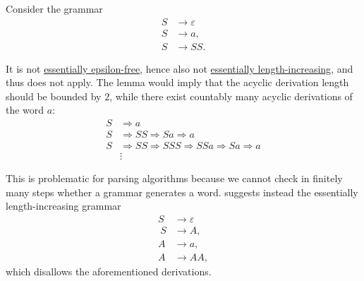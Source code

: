 \begin{example}\label{ex:unboudned_grammar_derivation_length}
  Consider the grammar
  \begin{equation}\label{eq:ex:unboudned_grammar_derivation_length/bad}
    \begin{aligned}
      S &\to \varepsilon \\
      S &\to a, \\
      S &\to SS.
    \end{aligned}
  \end{equation}

  It is not \hyperref[def:epsilon_free_grammar]{essentially epsilon-free}, hence also not \hyperref[def:length_increasing_grammar]{essentially length-increasing}, and thus  does not apply. The lemma would imply that the acyclic derivation length should be bounded by \( 2 \), while there exist countably many acyclic derivations of the word \( a \):
  \begin{equation*}
    \begin{aligned}
      S &\Rightarrow a \\
      S &\Rightarrow SS \Rightarrow Sa \Rightarrow a \\
      S &\Rightarrow SS \Rightarrow SSS \Rightarrow SSa \Rightarrow Sa \Rightarrow a \\
        &\vdots
    \end{aligned}
  \end{equation*}

  This is problematic for parsing algorithms because we cannot check in finitely many steps whether a grammar generates a word.  suggests instead the essentially length-increasing grammar
  \begin{equation*}
    \begin{aligned}
      S &\to \varepsilon \\\
      S &\to A, \\
      A &\to a, \\
      A &\to AA,
    \end{aligned}
  \end{equation*}
  which disallows the aforementioned derivations.
\end{example}

